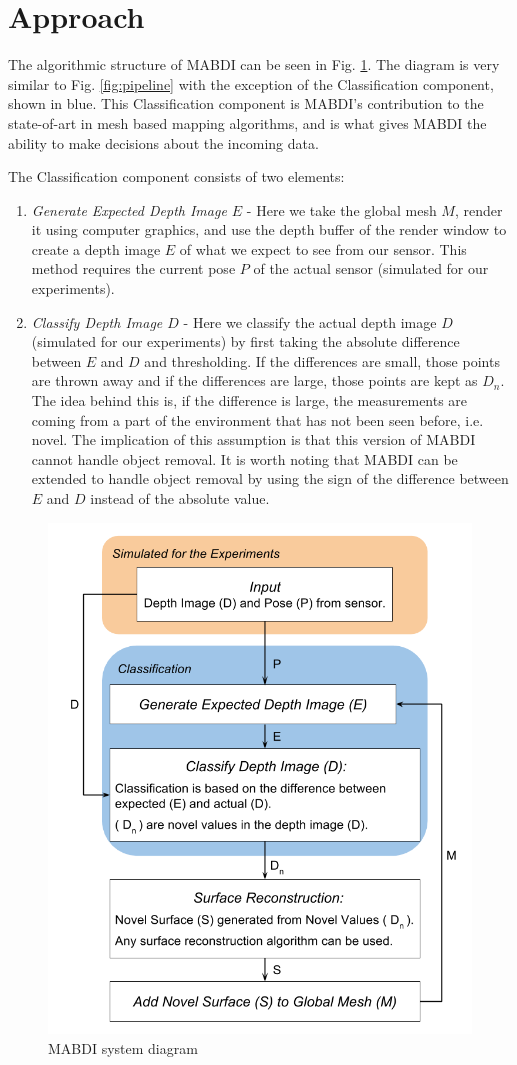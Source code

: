 \section{Approach}	\label{sec:approach}

The algorithmic structure of MABDI can be seen in Fig. \ref{fig:system}. The
diagram is very similar to Fig. \ref{fig:pipeline} with the exception of the
Classification component, shown in blue. This Classification component is
MABDI's contribution to the state-of-art in mesh based mapping algorithms, and
is what gives MABDI the ability to make decisions about the incoming data.

The Classification component consists of two elements:
\begin{enumerate}
    \item \textit{Generate Expected Depth Image $E$} - Here we take the global
    mesh $M$, render it using computer graphics, and use the depth buffer of the
    render window to create a depth image $E$ of what we expect to see from our
    sensor. This method requires the current pose $P$ of the actual sensor
    (simulated for our experiments).
    \item \textit{Classify Depth Image $D$} - Here we classify the actual depth
    image $D$ (simulated for our experiments) by first taking the absolute
    difference between $E$ and $D$ and thresholding. If the differences are
    small, those points are thrown away and if the differences are large, those
    points are kept as $D_n$. The idea behind this is, if the difference is
    large, the measurements are coming from a part of the environment that has
    not been seen before, i.e. novel. The implication of this assumption is that
    this version of MABDI cannot handle object removal. It is worth noting
    that MABDI can be extended to handle object removal by using the sign of the
    difference between $E$ and $D$ instead of the absolute value.
\end{enumerate}

\begin{figure}[h]%
\centering
\includegraphics[width=.5\textwidth]{figures/diagram_system.png}
\caption{MABDI system diagram}
\label{fig:system}
\end{figure}

